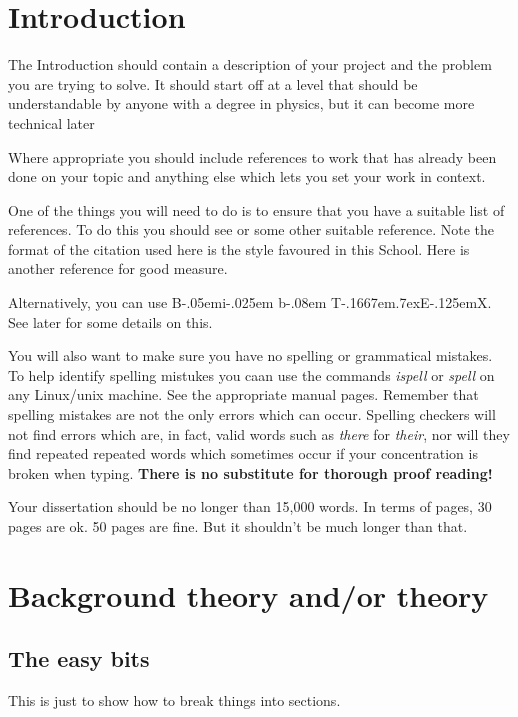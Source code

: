 \documentclass[12pt,a4paper]{report}
\def\BibTeX{{\rm B\kern-.05em{\sc i\kern-.025em b}\kern-.08em
    T\kern-.1667em\lower.7ex\hbox{E}\kern-.125emX}}
\begin{document}
\tableofcontents
\listoftables
\listoffigures


\chapter{Introduction}
The Introduction should contain a description of your project and the
problem you are trying to solve. It should start off at a level that
should be understandable by anyone with a degree in physics, but it
can become more technical later

Where appropriate you should include references to work that has
already been done on your topic and anything else which lets you set
your work in context.

One of the things you will need to do is to ensure that you have a
suitable list of references.  To do this you should see \cite{ref:lam}
or some other suitable reference.  Note the format of the citation used
here is the style favoured in this School.  Here is another
reference \cite{ref:bloggs} for good measure.

Alternatively, you can use \BibTeX. See later for some details on this.

You will also want to make sure you have no spelling or grammatical
mistakes. To help identify spelling mistukes you caan use the
commands \emph{ispell} or \emph{spell} on any Linux/unix machine. See
the appropriate manual pages. Remember that spelling mistakes are not
the only errors which can occur. Spelling checkers will not find
errors which are, in fact, valid words such as \emph{there} for {\em
  their}, nor will they find repeated repeated words which sometimes
occur if your concentration is broken when typing. \textbf{There is no
  substitute for thorough proof reading!}

Your dissertation should be no longer than 15,000 words. In terms of
pages, 30 pages are ok. 50 pages are fine. But it shouldn't be
much longer than that.


\chapter{Background theory and/or theory}

\section{The easy bits}
This is just to show how to break things into sections.
\end{document}
